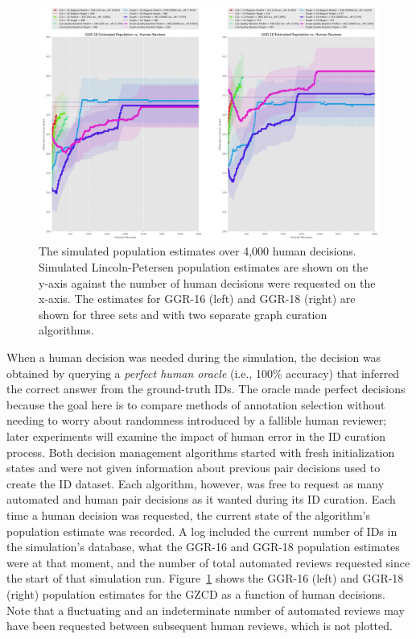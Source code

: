 \begin{figure}[!t]
    \begin{center}
        \includegraphics[width=0.9\linewidth]{resources/lca-decisions3.pdf}
    \end{center}
    \caption{The simulated population estimates over 4,000 human decisions.  Simulated Lincoln-Petersen population estimates are shown on the y-axis against the number of human decisions were requested on the x-axis.  The estimates for GGR-16 (left) and GGR-18 (right) are shown for three sets and with two separate graph curation algorithms.}
    \label{fig:ca-sim3}
\end{figure}

When a human decision was needed during the simulation, the decision was obtained by querying a \textit{perfect human oracle} (i.e., 100\% accuracy) that inferred the correct answer from the ground-truth IDs.  The oracle made perfect decisions because the goal here is to compare methods of annotation selection without needing to worry about randomness introduced by a fallible human reviewer; later experiments will examine the impact of human error in the ID curation process.  Both decision management algorithms started with fresh initialization states and were not given information about previous pair decisions used to create the ID dataset.  Each algorithm, however, was free to request as many automated and human pair decisions as it wanted during its ID curation.  Each time a human decision was requested, the current state of the algorithm's population estimate was recorded.  A log included the current number of IDs in the simulation's database, what the GGR-16 and GGR-18 population estimates were at that moment, and the number of total automated reviews requested since the start of that simulation run.  Figure~\ref{fig:ca-sim3} shows the GGR-16 (left) and GGR-18 (right) population estimates for the GZCD as a function of human decisions.  Note that a fluctuating and an indeterminate number of automated reviews may have been requested between subsequent human reviews, which is not plotted.


